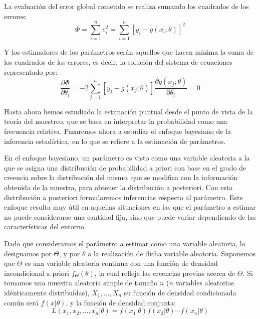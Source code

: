 La evaluaci\'on del error global cometido se realiza sumando los cuadrados de los errores:
\begin{equation*}
\Phi=\sum_{i=1}^ne_i^2=\sum_{i=1}^n\left[y_i-g(x_i;\theta)\right]^2
\end{equation*}

Y los estimadores de los par\'ametros ser\'an aquellos que hacen m\'inima la suma de los cuadrados de los errores, es decir, la soluci\'on del sistema de ecuaciones representado por:
\begin{equation*}
\dfrac{\partial\Phi}{\partial\theta_i}=-2\sum_{j=1}^n\left[y_j-g(x_j;\theta)\right]\dfrac{\partial g(x_j;\theta)}{\partial\theta_i}=0
\end{equation*}


Hasta ahora hemos estudiado la estimaci\'on puntual desde el punto de vista de la teor\'ia del muestreo, que se basa en interpretar la probabilidad como una frecuencia relativa. Pasaremos ahora a estudiar el enfoque bayesiano de la inferencia estad\'istica, en lo que se refiere a la estimaci\'on de par\'ametros.

En el enfoque bayesiano, un par\'ametro es visto como una variable aleatoria a la que se asigna una distribuci\'on de probabilidad a priori con base en el grado de creencia sobre la distribuci\'on del mismo, que se modifica con la informaci\'on obtenida de la muestra, para obtener la distribuci\'on a posteriori. Con esta distribuci\'on a posteriori formularemos inferencias respecto al par\'ametro. Este enfoque resulta muy \'util en aquellas situaciones en las que el par\'ametro a estimar no puede considerarse una cantidad fija, sino que puede variar dependiendo de las caracter\'isticas del entorno.

Dado que consideramos el par\'ametro a estimar como una variable aleatoria, lo designamos por $\Theta$, y por $\theta$ a la realizaci\'on de dicha variable aleatoria. Suponemos que $\Theta$ es una variable aleatoria cont\'inua con una funci\'on de densidad incondicional a priori $f_{\Theta}(\theta)$, la cual refleja las creencias previas acerca de $\Theta$. Si tomamos una muestra aleatoria simple de tama\~no $n$ ($n$ variables aleatorias id\'enticamente distribu\'idas), $X_1,\ldots,X_n$ su funci\'on de densidad condicionada com\'un ser\'a $f(x|\theta)$, y la funci\'on de densidad conjunta:
\begin{equation*}
L(x_1,x_2,\ldots,x_n|\theta)=f(x_1|\theta)f(x_2|\theta)\cdots f(x_n|\theta)
\end{equation*}

